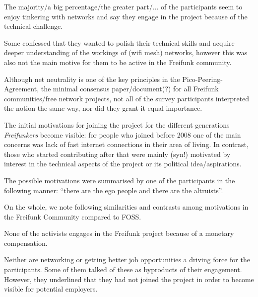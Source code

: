 
The majority/a big percentage/the greater part/... of the participants seem to enjoy tinkering with networks and say they engage in the project because of the technical challenge.

Some confessed that they wanted to polish their technical skills and acquire deeper understanding of the workings of (wifi mesh) networks, however this was also not the main motive for them to be active in the Freifunk community.

Although net neutrality is one of the key principles in the Pico-Peering-Agreement, the minimal consensus paper/document(?) for all Freifunk communities/free network projects, not all of the survey participants interpreted the notion the same way, nor did they grant it equal importance.

The initial motivations for joining the project for the different generations \textit{Freifunkers} become visible:
for people who joined before 2008 one of the main concerns was lack of fast internet connections in their area of living.
In contrast, those who started contributing after that were mainly (syn!) motivated by interest in the technical aspects of the project or its political idea/aspirations.

The possible motivations were summarised by one of the participants in the following manner: ``there are the ego people and there are the altruists''.

On the whole, we note following similarities and contrasts among motivations in the Freifunk Community compared to FOSS.

None of the activists engages in the Freifunk project because of a monetary compensation.

Neither are networking or getting better job opportunities a driving force for the participants.
Some of them talked of these as byproducts of their engagement.
However, they underlined that they had not joined the project in order to become visible for potential employers.



